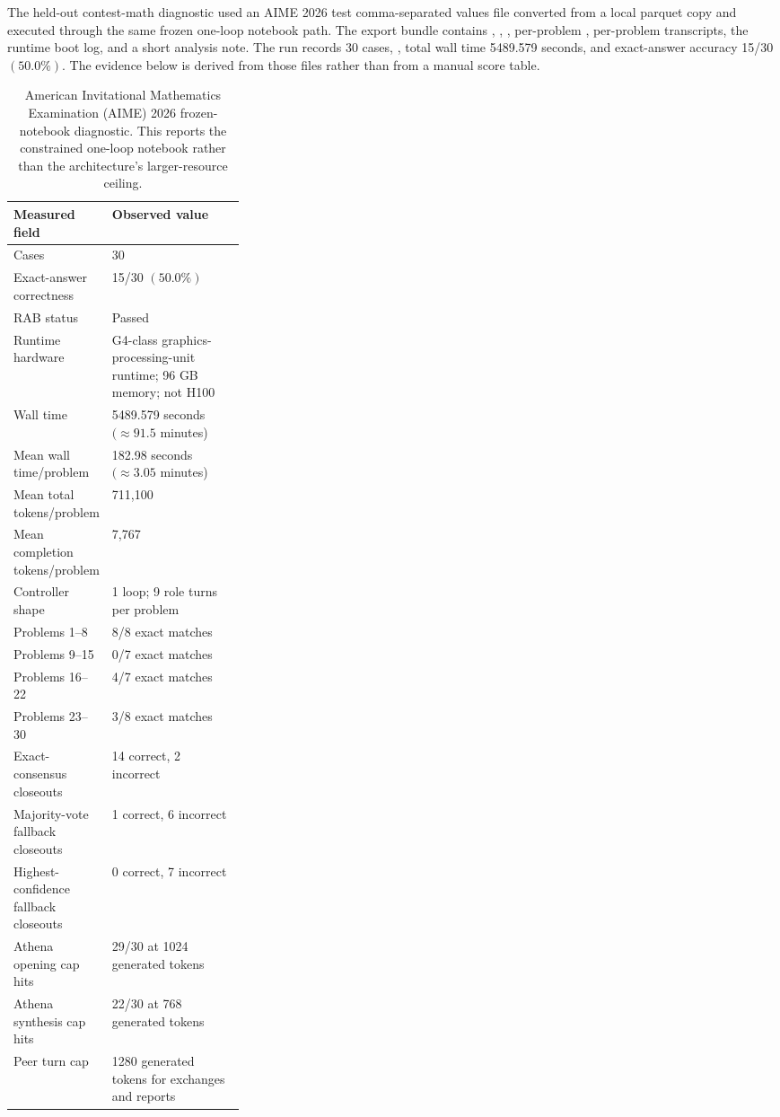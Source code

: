 \documentclass[11pt]{article}
\newcommand{\rab}{RAB}
\begin{document}
The held-out contest-math diagnostic used an AIME 2026 test comma-separated values file converted from a local parquet copy and executed through the same frozen one-loop notebook path. The export bundle contains , , , per-problem , per-problem transcripts, the runtime boot log, and a short analysis note. The run records 30 cases, , total wall time 5489.579 seconds, and exact-answer accuracy 15/30 \((50.0\%)\). The evidence below is derived from those files rather than from a manual score table.

\begin{table}[H]
\centering
\small
\begin{tabularx}{\linewidth}{p{0.30\linewidth}X}
\toprule
Measured field & Observed value \\
\midrule
Cases & 30 \\
Exact-answer correctness & 15/30 \((50.0\%)\) \\
\rab{} status & Passed \\
Runtime hardware & G4-class graphics-processing-unit runtime; 96 GB memory; not H100 \\
Wall time & 5489.579 seconds \((\approx 91.5\) minutes) \\
Mean wall time/problem & 182.98 seconds \((\approx 3.05\) minutes) \\
Mean total tokens/problem & 711,100 \\
Mean completion tokens/problem & 7,767 \\
Controller shape & 1 loop; 9 role turns per problem \\
Problems 1--8 & 8/8 exact matches \\
Problems 9--15 & 0/7 exact matches \\
Problems 16--22 & 4/7 exact matches \\
Problems 23--30 & 3/8 exact matches \\
Exact-consensus closeouts & 14 correct, 2 incorrect \\
Majority-vote fallback closeouts & 1 correct, 6 incorrect \\
Highest-confidence fallback closeouts & 0 correct, 7 incorrect \\
Athena opening cap hits & 29/30 at 1024 generated tokens \\
Athena synthesis cap hits & 22/30 at 768 generated tokens \\
Peer turn cap & 1280 generated tokens for exchanges and reports \\
\bottomrule
\end{tabularx}
\caption{American Invitational Mathematics Examination (AIME) 2026 frozen-notebook diagnostic. This reports the constrained one-loop notebook rather than the architecture's larger-resource ceiling.}
\label{tab:aime2026-frozen}
\end{table}
\end{document}
